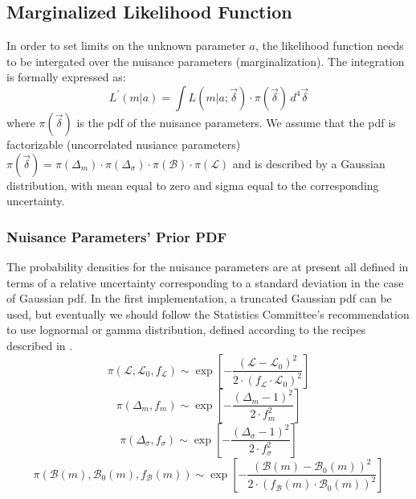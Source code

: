   \subsection{Marginalized Likelihood Function}
    In order to set limits on the unknown parameter $a$, the likelihood function needs to be intergated over the nuisance parameters (marginalization). The integration is formally expressed as: 
    \begin{equation}
      L^\prime(m|a)=\int{L(m|a;\vec{\delta})\cdot\pi(\vec{\delta})\,d^4\vec{\delta}}
    \end{equation}
    where $\pi(\vec{\delta})$ is the pdf of the nuisance parameters. We assume that the pdf is factorizable (uncorrelated nusiance parameters) $\pi(\vec{\delta})=\pi(\Delta_m)\cdot\pi(\Delta_\sigma)\cdot\pi(\mathcal{B})\cdot\pi(\mathcal{L})$ and is described by a Gaussian distribution, with mean equal to zero and sigma equal to the corresponding uncertainty.

    \subsubsection{Nuisance Parameters' Prior PDF}
    The probability densities for the nuisance parameters are at present all defined in terms of a relative uncertainty corresponding to a standard deviation in the case of Gaussian pdf. In the first implementation, a truncated Gaussian pdf can be used, but eventually we should follow the Statistics Committee's recommendation to use lognormal or gamma distribution, defined according to the recipes described in \cite{bib:statistics}.
    \begin{equation}
      \pi(\mathcal{L},\mathcal{L}_0,f_\mathcal{L})\sim\exp{\left[-\frac{\left(\mathcal{L}-\mathcal{L}_0\right)^2}{2\cdot\left(f_\mathcal{L}\cdot\mathcal{L}_0\right)^2}\right]}
    \end{equation}
    \begin{equation}
      \pi(\Delta_m,f_m)\sim\exp{\left[-\frac{\left(\Delta_m-1\right)^2}{2\cdot f_m^2}\right]}
    \end{equation}
    \begin{equation}
      \pi(\Delta_\sigma,f_\sigma)\sim\exp{\left[-\frac{\left(\Delta_\sigma-1\right)^2}{2\cdot f_\sigma^2}\right]}
    \end{equation}
    \begin{equation}
      \pi(\mathcal{B}(m),\mathcal{B}_0(m),f_\mathcal{B}(m))\sim\exp{\left[-\frac{\left(\mathcal{B}(m)-\mathcal{B}_0(m)\right)^2}{2\cdot\left(f_\mathcal{B}(m)\cdot\mathcal{B}_0(m)\right)^2}\right]}
    \end{equation}
